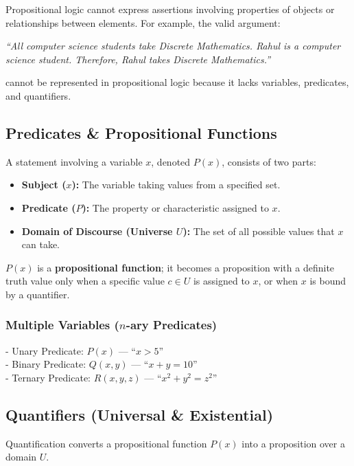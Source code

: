 \documentclass[11pt,a4paper]{article}
\begin{document}
Propositional logic cannot express assertions involving properties of objects or relationships between elements. For example, the valid argument:
\begin{center}
\textit{``All computer science students take Discrete Mathematics. Rahul is a computer science student. Therefore, Rahul takes Discrete Mathematics.''}
\end{center}
cannot be represented in propositional logic because it lacks variables, predicates, and quantifiers.

\subsection{Predicates \& Propositional Functions}

\begin{definition}
A statement involving a variable $x$, denoted $P(x)$, consists of two parts:
\begin{itemize}[leftmargin=1.5em]
    \item \textbf{Subject ($x$):} The variable taking values from a specified set.
    \item \textbf{Predicate ($P$):} The property or characteristic assigned to $x$.
    \item \textbf{Domain of Discourse (Universe $U$):} The set of all possible values that $x$ can take.
\end{itemize}
$P(x)$ is a \textbf{propositional function}; it becomes a proposition with a definite truth value only when a specific value $c \in U$ is assigned to $x$, or when $x$ is bound by a quantifier.
\end{definition}

\subsubsection*{Multiple Variables ($n$-ary Predicates)}
- Unary Predicate: $P(x)$ --- ``$x > 5$'' \\
- Binary Predicate: $Q(x, y)$ --- ``$x + y = 10$'' \\
- Ternary Predicate: $R(x, y, z)$ --- ``$x^2 + y^2 = z^2$''

\subsection{Quantifiers (Universal \& Existential)}

Quantification converts a propositional function $P(x)$ into a proposition over a domain $U$.
\end{document}
